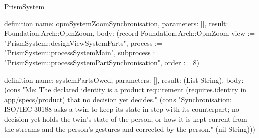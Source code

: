\begin{lexlean}{PrismSystem}
\begin{semanticmodule}
definition{
  name: opmSystemZoomSynchronisation,
  parameters: [],
  result: Foundation.Arch::OpmZoom,
  body: (record Foundation.Arch::OpmZoom {view := "PrismSystem::designViewSystemParts", process := "PrismSystem::processSystemMain", subprocess := "PrismSystem::processSystemPartSynchronisation", order := 8})
}

definition{
  name: systemPartsOwed,
  parameters: [],
  result: (List String),
  body: (cons "Me: The declared identity is a product requirement (requires.identity in app/specs/product) that no decision yet decides." (cons "Synchronisation: ISO/IEC 30188 asks a twin to keep its state in step with its counterpart; no decision yet holds the twin's state of the person, or how it is kept current from the streams and the person's gestures and corrected by the person." (nil String)))
}


\end{semanticmodule}
\end{lexlean}
